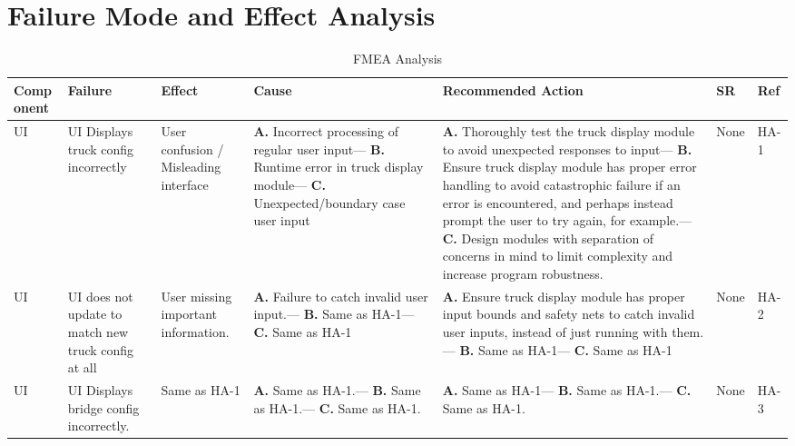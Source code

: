 \documentclass{article}
\begin{document}
\section{Failure Mode and Effect Analysis}
\begin{table}[H]
    \caption{FMEA Analysis} \label{TblFMEA}
    \begin{tabular}{|p{} | p{} | p{} | p{} | p{} | p{} | p{}|}
    \toprule
    \textbf{Comp onent} & \textbf{Failure} & \textbf{Effect} & \textbf{Cause} & \textbf{Recommended Action} & \textbf{SR} & \textbf{Ref}\\
    \midrule
    UI & UI Displays truck config incorrectly & User confusion / Misleading interface
&   \textbf{A.} Incorrect processing of regular user input---
    \textbf{B.} Runtime error in truck display module---
    \textbf{C.} Unexpected/boundary case user input 
&   \textbf{A.} Thoroughly test the truck display module to avoid unexpected responses to input---
    \textbf{B.}  Ensure truck display module has proper error handling to avoid catastrophic failure if an error is encountered, and perhaps instead prompt the user to try again, for example.---
    \textbf{C.} Design modules with separation of concerns in mind to limit complexity and increase program robustness.
&None&HA-1\\
    \midrule
    UI & UI does not update to match new truck config at all & User missing important information. & \textbf{A.} Failure to catch invalid user input.---
    \textbf{B.} Same as HA-1---
    \textbf{C.} Same as HA-1 
&   \textbf{A.} Ensure truck display module has proper input bounds and safety nets to catch invalid user inputs, instead of just running with them.---
    \textbf{B.} Same as HA-1---
    \textbf{C.} Same as HA-1
&None&HA-2\\
    \midrule
    UI & UI Displays bridge config incorrectly. & Same as HA-1 & \textbf{A.} Same as HA-1.---
    \textbf{B.} Same as HA-1.---
    \textbf{C.}  Same as HA-1.
&  \textbf{A.} Same as HA-1---
    \textbf{B.} Same as HA-1.---
    \textbf{C.} Same as HA-1.
    &None&HA-3\\
    \bottomrule
  \end{tabular}
  \end{table}
\pagebreak
\end{document}
